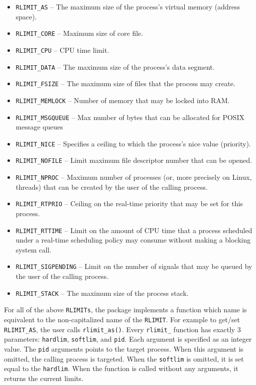 \begin{itemize}
  \item \texttt{RLIMIT\_AS} -- The maximum size of the process's virtual memory
  (address space).
  \item \texttt{RLIMIT\_CORE} -- Maximum size of core file.
  \item \texttt{RLIMIT\_CPU} -- CPU time limit.
  \item \texttt{RLIMIT\_DATA} --  The maximum size of the process's data
  segment.
  \item \texttt{RLIMIT\_FSIZE} --  The maximum size of files that the process
  may create.
  \item \texttt{RLIMIT\_MEMLOCK} -- Number of memory that may be locked into
  RAM.
  \item \texttt{RLIMIT\_MSGQUEUE} -- Max number of bytes that can be allocated
  for POSIX message queues
  \item \texttt{RLIMIT\_NICE} --  Specifies a ceiling to which the process's
  nice value (priority).
  \item \texttt{RLIMIT\_NOFILE} -- Limit maximum file descriptor number that
  can be opened.
  \item \texttt{RLIMIT\_NPROC} -- Maximum number of processes (or, more
  precisely on Linux, threads) that can be created by the user of the calling
  process.
  \item \texttt{RLIMIT\_RTPRIO} -- Ceiling on the real-time priority that may be
  set for this process.
  \item \texttt{RLIMIT\_RTTIME} -- Limit on the amount of CPU time that a
  process scheduled under a real-time scheduling policy may consume without
  making a blocking system call.
  \item \texttt{RLIMIT\_SIGPENDING} -- Limit on the number of signals that may
  be queued by the user of the calling process.
  \item \texttt{RLIMIT\_STACK} -- The maximum size of the process stack.
\end{itemize}

For all of the above \texttt{RLIMITs}, the \RAppArmor package implements a
function which name is equivalent to the non-capitalized name of the
\texttt{RLIMIT}. For example to get/set \texttt{RLIMIT\_AS}, the user calls
\texttt{rlimit\_as()}. Every \texttt{rlimit\_} function has exactly 3 parameters:
\texttt{hardlim}, \texttt{softlim}, and \texttt{pid}. Each argument is
specified as an integer value. The \texttt{pid} arguments points to the target
process. When this argument is omitted, the calling process is targeted. When
the \texttt{softlim} is omitted, it is set equal to the \texttt{hardlim}.
When the function is called without any arguments, it returns the current limits.

